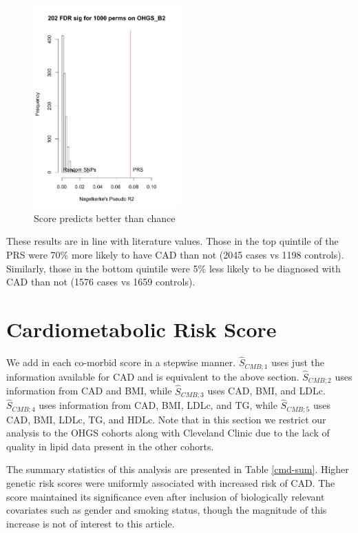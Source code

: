 \begin{figure}[H]
\label{b2_perm}
\caption{Score predicts better than chance}
\centering
\includegraphics[width=0.5\textwidth]{Figures/b2.png}
\end{figure}

These results are in line with literature values. Those in the top quintile of the \ac{PRS} were 70\% more likely to have \ac{CAD} than not (2045 cases vs 1198 controls). Similarly, those in the bottom quintile were  5\% less likely to be diagnosed with \ac{CAD} than not (1576 cases vs 1659 controls).

\section{Cardiometabolic Risk Score}

We add in each co-morbid score in a stepwise manner. $\hat{S}_{CMB; 1}$ uses just the information available for CAD and is equivalent to the above section.  $\hat{S}_{CMB; 2}$ uses information from CAD and BMI, while $\hat{S}_{CMB; 3}$ uses CAD, BMI, and LDLc. $\hat{S}_{CMB; 4}$ uses information from CAD, BMI, LDLc, and TG, while $\hat{S}_{CMB; 5}$ uses CAD, BMI, LDLc, TG, and HDLc. Note that in this section we restrict our analysis to the \ac{OHGS} cohorts along with Cleveland Clinic due to the lack of quality in lipid data present in the other cohorts. 

The summary statistics of this analysis are presented in Table \ref{cmd-sum}. Higher genetic risk scores were uniformly associated with increased risk of \ac{CAD}. The score maintained its significance even after inclusion of biologically relevant covariates such as gender and smoking status, though the magnitude of this increase is not of interest to this article. 

